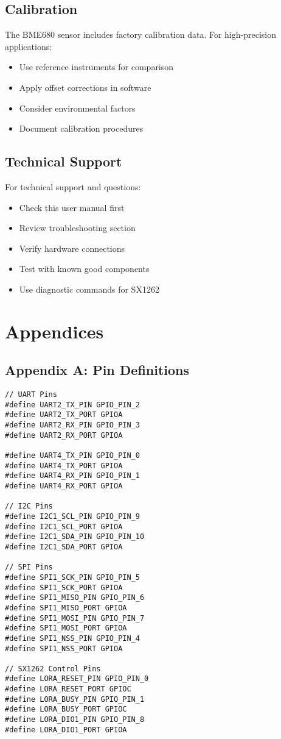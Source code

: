 \documentclass[11pt,a4paper]{article}
\begin{document}
\subsection{Calibration}
The BME680 sensor includes factory calibration data. For high-precision applications:

\begin{itemize}
    \item Use reference instruments for comparison
    \item Apply offset corrections in software
    \item Consider environmental factors
    \item Document calibration procedures
\end{itemize}

\subsection{Technical Support}
For technical support and questions:

\begin{itemize}
    \item Check this user manual first
    \item Review troubleshooting section
    \item Verify hardware connections
    \item Test with known good components
    \item Use diagnostic commands for SX1262
\end{itemize}

\section{Appendices}

\subsection{Appendix A: Pin Definitions}
\begin{lstlisting}[caption=Pin Definitions in main.h]
// UART Pins
#define UART2_TX_PIN GPIO_PIN_2
#define UART2_TX_PORT GPIOA
#define UART2_RX_PIN GPIO_PIN_3
#define UART2_RX_PORT GPIOA

#define UART4_TX_PIN GPIO_PIN_0
#define UART4_TX_PORT GPIOA
#define UART4_RX_PIN GPIO_PIN_1
#define UART4_RX_PORT GPIOA

// I2C Pins
#define I2C1_SCL_PIN GPIO_PIN_9
#define I2C1_SCL_PORT GPIOA
#define I2C1_SDA_PIN GPIO_PIN_10
#define I2C1_SDA_PORT GPIOA

// SPI Pins
#define SPI1_SCK_PIN GPIO_PIN_5
#define SPI1_SCK_PORT GPIOA
#define SPI1_MISO_PIN GPIO_PIN_6
#define SPI1_MISO_PORT GPIOA
#define SPI1_MOSI_PIN GPIO_PIN_7
#define SPI1_MOSI_PORT GPIOA
#define SPI1_NSS_PIN GPIO_PIN_4
#define SPI1_NSS_PORT GPIOA

// SX1262 Control Pins
#define LORA_RESET_PIN GPIO_PIN_0
#define LORA_RESET_PORT GPIOC
#define LORA_BUSY_PIN GPIO_PIN_1
#define LORA_BUSY_PORT GPIOC
#define LORA_DIO1_PIN GPIO_PIN_8
#define LORA_DIO1_PORT GPIOA
\end{lstlisting}
\end{document}
